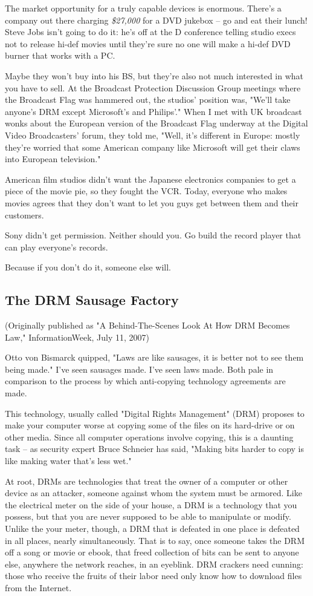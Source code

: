 The market opportunity for a truly capable devices is enormous.
There's a company out there charging \emph{\$27,000} for a DVD
jukebox -- go and eat their lunch! Steve Jobs isn't going to do it:
he's off at the D conference telling studio execs not to release
hi-def movies until they're sure no one will make a hi-def DVD
burner that works with a PC.

Maybe they won't buy into his BS, but they're also not much
interested in what you have to sell. At the Broadcast Protection
Discussion Group meetings where the Broadcast Flag was hammered
out, the studios' position was, "We'll take anyone's DRM except
Microsoft's and Philips'." When I met with UK broadcast wonks about
the European version of the Broadcast Flag underway at the Digital
Video Broadcasters' forum, they told me, "Well, it's different in
Europe: mostly they're worried that some American company like
Microsoft will get their claws into European television."

American film studios didn't want the Japanese electronics
companies to get a piece of the movie pie, so they fought the VCR.
Today, everyone who makes movies agrees that they don't want to let
you guys get between them and their customers.

Sony didn't get permission. Neither should you. Go build the record
player that can play everyone's records.

Because if you don't do it, someone else will.

\subsection{The DRM Sausage Factory}

(Originally published as "A Behind-The-Scenes Look At How DRM
Becomes Law," InformationWeek, July 11, 2007)

Otto von Bismarck quipped, "Laws are like sausages, it is better
not to see them being made." I've seen sausages made. I've seen
laws made. Both pale in comparison to the process by which
anti-copying technology agreements are made.

This technology, usually called "Digital Rights Management" (DRM)
proposes to make your computer worse at copying some of the files
on its hard-drive or on other media. Since all computer operations
involve copying, this is a daunting task -- as security expert
Bruce Schneier has said, "Making bits harder to copy is like making
water that's less wet."

At root, DRMs are technologies that treat the owner of a computer
or other device as an attacker, someone against whom the system
must be armored. Like the electrical meter on the side of your
house, a DRM is a technology that you possess, but that you are
never supposed to be able to manipulate or modify. Unlike the your
meter, though, a DRM that is defeated in one place is defeated in
all places, nearly simultaneously. That is to say, once someone
takes the DRM off a song or movie or ebook, that freed collection
of bits can be sent to anyone else, anywhere the network reaches,
in an eyeblink. DRM crackers need cunning: those who receive the
fruits of their labor need only know how to download files from the
Internet.

